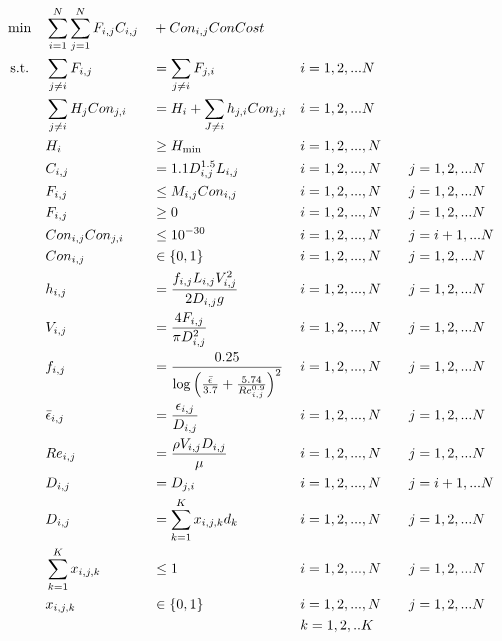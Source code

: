\documentclass[12pt]{article}
\begin{document}
	\begin{equation}
	\begin{aligned}
	& \min &&\sum_{i=1}^{N}\sum_{j=1}^{N} F_{i,j} C_{i,j} &&+ Con_{i,j} ConCost\\
	& \text{ s.t.} && \sum_{j \neq i} F_{i,j} && = \sum_{j \neq i} F_{j,i} \quad && i = 1, 2, ... N\\
	& && \sum_{j \neq i} H_j Con_{j,i} && = H_i + \sum_{J \neq i} h_{j,i}Con_{j,i} && i = 1,2, ...N\\
	& && H_i && \geq H_{\rm{min}} && i = 1, 2, ..., N \\
	& && C_{i,j} && = 1.1 D_{i,j}^{1.5} L_{i,j} && i = 1, 2, ..., N \quad && j = 1, 2, ... N\\
	& && F_{i,j} && \leq M_{i,j} Con_{i,j} && i = 1, 2, ..., N \quad && j = 1, 2, ... N\\
	& && F_{i,j} && \geq 0 && i = 1, 2, ..., N \quad && j = 1, 2, ... N\\
	& && Con_{i,j}Con_{j,i} && \leq 10^{-30} && i = 1, 2, ..., N \quad && j = i+1, ... N\\
	& && Con_{i,j} &&\in \{0,1\} && i = 1, 2, ..., N \quad && j = 1, 2, ... N\\
	& && h_{i,j} && = \frac{f_{i,j} L_{i,j} V_{i,j}^2}{2D_{i,j} g} && i = 1, 2, ..., N \quad && j = 1, 2, ... N\\
	& && V_{i,j} && = \frac{4 F_{i,j}}{\pi D_{i,j}^2} && i = 1, 2, ..., N \quad && j = 1, 2, ... N\\
	& && f_{i,j} &&= \frac{0.25}{\log\left(\frac{\bar{\epsilon}}{3.7} + \frac{5.74}{Re_{i,j}^{0.9}}\right)^2} && i = 1, 2, ..., N \quad && j = 1, 2, ... N\\
	& && \bar{\epsilon}_{i,j} && = \frac{\epsilon_{i,j}}{D_{i,j}} && i = 1, 2, ..., N \quad && j = 1, 2, ... N\\
	& && Re_{i,j} && = \frac{\rho V_{i,j} D_{i,j}}{\mu} && i = 1, 2, ..., N \quad && j = 1, 2, ... N\\
	& && D_{i,j} && = D_{j,i} && i = 1, 2, ..., N \quad && j = i+1, ... N\\
	& && D_{i,j} && = \sum_{k=1}^{K}x_{i,j,k}d_k && i = 1, 2, ..., N \quad && j = 1, 2, ... N\\
	& && \sum_{k=1}^{K} x_{i,j,k} && \leq 1 && i = 1, 2, ..., N \quad && j = 1, 2, ... N\\
	& && x_{i,j,k} && \in \{0,1\} && i = 1, 2, ..., N \quad && j = 1, 2, ... N \\
	& && && && k = 1,2, ..K\\ 
	\end{aligned}
	\end{equation}
	
\end{document}

